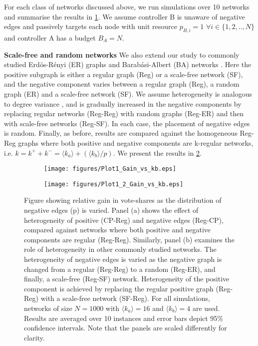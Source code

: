 For each class of networks discussed above, we run simulations over 10 networks and summarise the results in \cref{Fig-2a}. We assume controller B is unaware of negative edges and passively targets each node with unit resource $p_{B,i}  = 1$ $\forall i \in \{1,2,..,N\}$ and controller A has a budget $B_{A} = N$.


\textbf{Scale-free and random networks}
We also extend our study to commonly studied Erdös-Rényi (ER) graphs \cite{erdHos1960evolution} and Barabási-Albert (BA) networks \cite{barabasi2013network}. Here the positive subgraph is either a regular graph (Reg) or a scale-free network (SF), and the negative component varies between a regular graph (Reg), a random graph (ER) and a scale-free network (SF).
We assume heterogeneity is analogous to degree variance \cite{bell1992note}, and is gradually increased in the negative components by replacing regular networks (Reg-Reg) with random graphs (Reg-ER) and then with scale-free networks (Reg-SF). In each case, the placement of negative edges is random. Finally, as before, results are compared against the homogeneous Reg-Reg graphs where both positive and negative components are k-regular networks, i.e. $ k = k^{+} + k^{-}=\langle k_{a} \rangle + (\langle k_{b} \rangle/p)$. 
We present the results in \cref{Fig-2b}.  

\begin{figure}
  \begin{subfigure}[b]{0.475\textwidth}
  \centering
    \texttt{[image: figures/Plot1\_Gain\_vs\_kb.eps]}
    \caption{}
    \label{Fig-2a}
  \end{subfigure}
   \hspace{1em}
  \begin{subfigure}[b]{0.475\textwidth}
  \centering
    \texttt{[image: figures/Plot1\_2\_Gain\_vs\_kb.eps]}
    \caption{}
    \label{Fig-2b}
  \end{subfigure}
  \caption{Figure showing relative gain in vote-shares as the distribution of negative edges (p) is varied. Panel (a) shows the effect of heterogeneity of positive (CP-Reg) and negative edges (Reg-CP), compared against networks where both positive and negative components are regular (Reg-Reg). Similarly, panel (b) examines the role of heterogeneity in other commonly studied networks. The heterogeneity of negative edges is varied as the negative graph is changed from a regular (Reg-Reg) to a random (Reg-ER), and finally, a scale-free (Reg-SF) network. Heterogeneity of the positive component is achieved by replacing the regular positive graph (Reg-Reg) with a scale-free network (SF-Reg). 
  For all simulations, networks of size $N=1000$ with $\langle k_{a} \rangle = 16$ and $\langle k_{b} \rangle = 4$ are used. Results are averaged over 10 instances and error bars depict 95\% confidence intervals. Note that the panels are scaled differently for clarity.}
  \label{Fig-2}
\end{figure}

